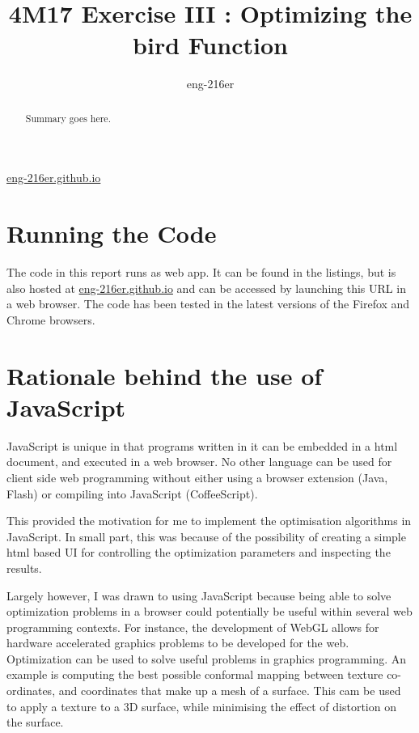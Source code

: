 \documentclass[a4paper,12pt]{article}
\begin{document}

\title{4M17 Exercise III : Optimizing the bird Function}
\author{eng-216er}

\maketitle

\begin{center}
\url{eng-216er.github.io}
\end{center}


\begin{abstract}
Summary goes here.
\end{abstract}

\newpage
\tableofcontents
\listoffigures
\listoftables
\newpage

\section{ Running the Code }

The code in this report runs as web app.
It can be found in the listings, but is also hosted at \url{eng-216er.github.io} and can be accessed by launching this URL in a web browser. 
The code has been tested in the latest versions of the Firefox and Chrome browsers.  


\section{ Rationale behind the use of JavaScript }

 JavaScript is unique in that programs written in it can be embedded in a html document, and executed in a web browser. 
No other language can be used for client side web programming without either using a browser extension (Java, Flash) or compiling into JavaScript (CoffeeScript).

This provided the motivation for me to implement the optimisation algorithms in JavaScript. 
In small part, this was because of the possibility of creating a simple html based UI for controlling the optimization parameters and inspecting the results. 

Largely however, I was drawn to using JavaScript because being able to solve optimization problems in a browser could potentially be useful within several web programming contexts. 
For instance, the  development of WebGL allows for hardware accelerated graphics problems to be developed for the web. 
Optimization can be used to solve useful problems in graphics programming.
An example is computing the best possible conformal mapping between texture co-ordinates, and coordinates that make up a mesh of a surface. 
This cam be used to apply a texture to a 3D surface, while minimising the effect of distortion on the surface.
\end{document}
